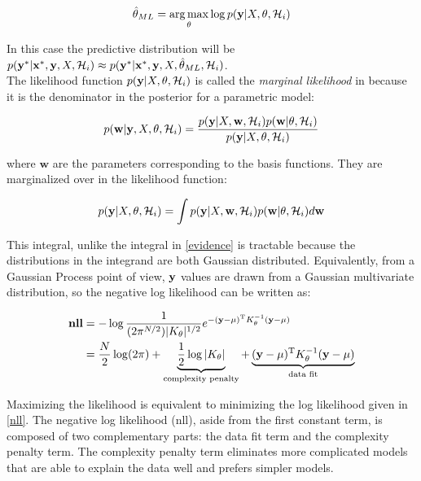 \begin{equation}
\hat{\theta}_{ML} = \operatorname*{arg\, max}_{\theta} \log p(\mathbf{y}|X,\theta,\mathcal{H}_{i}) \label{MLE}
\end{equation}

In this case the predictive distribution will be $p(\mathbf{y}^{*}|\mathbf{x}^{*},\mathbf{y},X,\mathcal{H}_{i}) \approx  p(\mathbf{y}^{*}|\mathbf{x}^{*},\mathbf{y},X,\hat{\theta}_{ML},\mathcal{H}_{i})$. \\

The likelihood function $p(\mathbf{y}|X,\theta,\mathcal{H}_{i})$ is called the \emph{marginal likelihood} in \cite{GPbook} because it is the denominator in the posterior for a parametric model:

\begin{equation}
p(\mathbf{w}|\mathbf{y},X,\theta,\mathcal{H}_{i}) = \frac{p(\mathbf{y}|X,\mathbf{w}, \mathcal{H}_{i})p(\mathbf{w}|\theta,\mathcal{H}_{i})}{p(\mathbf{y}|X,\theta,\mathcal{H}_{i})} \label{parametricBayes}
\end{equation}

where $\mathbf{w}$ are the parameters corresponding to the basis functions. They are marginalized over in the likelihood function:

\begin{equation}
p(\mathbf{y}|X,\theta,\mathcal{H}_{i}) = \int p(\mathbf{y}|X,\mathbf{w},\mathcal{H}_{i})p(\mathbf{w}|\theta,\mathcal{H}_{i})d\mathbf{w} \label{lvl2int}
\end{equation}

This integral, unlike the integral in \eqref{evidence} is tractable because the distributions in the integrand are both Gaussian distributed. Equivalently, from a Gaussian Process point of view, $\mathbf{y}$ values are drawn from a Gaussian multivariate distribution, so the negative log likelihood can be written as:

\begin{align}
\textbf{nll} &= - \log \frac{1}{(2\pi^{N/2})|K_{\theta}|^{1/2}}e^{-(\mathbf{y} - \mathbf{\mu})^{\mathrm{T}}K_{\theta}^{-1}(\mathbf{y} - \mathbf{\mu})} \\
&= \frac{N}{2}\log(2\pi) + \underbrace{\frac{1}{2}\log|K_{\theta}|}_{\text{complexity penalty}} + \underbrace{(\mathbf{y} - \mathbf{\mu})^{\mathrm{T}}K_{\theta}^{-1}(\mathbf{y} - \mathbf{\mu})}_{\text{data fit}}
\label{nll}
\end{align}

Maximizing the likelihood is equivalent to minimizing the log likelihood given in \eqref{nll}. The negative log likelihood (nll), aside from the first constant term, is composed of two complementary parts: the data fit term and the complexity penalty term. The complexity penalty term eliminates more complicated models that are able to explain the data well and prefers simpler models. 

